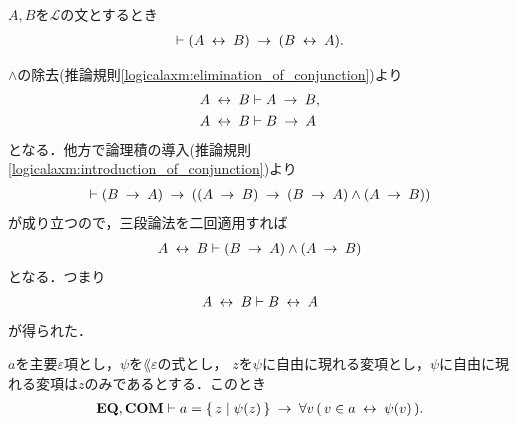 	\begin{screen}
		\begin{logicalthm}[同値記号の対称律]
		\label{logicalthm:symmetry_of_equivalence_arrows}
			$A,B$を$\mathcal{L}$の文とするとき
			\begin{align}
				\vdash (A \lrarrow B) \rarrow (B \lrarrow A).
			\end{align}
		\end{logicalthm}
	\end{screen}
	
	\begin{prf}
		$\wedge$の除去(推論規則\ref{logicalaxm:elimination_of_conjunction})より
		\begin{align}
			A \lrarrow B &\vdash A \rarrow B, \\
			A \lrarrow B &\vdash B \rarrow A
		\end{align}
		となる．他方で論理積の導入(推論規則\ref{logicalaxm:introduction_of_conjunction})より
		\begin{align}
			\vdash (B \rarrow A) \rarrow ((A \rarrow B) \rarrow 
			(B \rarrow A) \wedge (A \rarrow B))
		\end{align}
		が成り立つので，三段論法を二回適用すれば
		\begin{align}
			A \lrarrow B \vdash (B \rarrow A) \wedge (A \rarrow B)
		\end{align}
		となる．つまり
		\begin{align}
			A \lrarrow B \vdash B \lrarrow A
		\end{align}
		が得られた．
		\QED
	\end{prf}
	
	\begin{screen}
		\begin{thm}
		\label{thm:equivalent_formula_rewriting_1}
			$a$を主要$\varepsilon$項とし，$\psi$を$\lang{\varepsilon}$の式とし，
			$z$を$\psi$に自由に現れる変項とし，$\psi$に自由に現れる変項は$z$のみであるとする．このとき
			\begin{align}
				\EQAX,\COMAX \vdash a = \Set{z}{\psi(z)} 
				\rarrow \forall v\, (\, v \in a \lrarrow \psi(v)\, ).
			\end{align}
		\end{thm}
	\end{screen}
	
